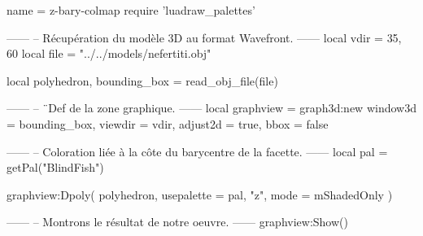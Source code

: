 \documentclass[border = 3pt]{standalone}
\begin{document}
\begin{luadraw*}{name = z-bary-colmap}
require 'luadraw_palettes'

------
-- Récupération du modèle 3D au format Wavefront.
------
local vdir = {35, 60}
local file = "../../models/nefertiti.obj"

local polyhedron, bounding_box = read_obj_file(file)

------
-- ¨Def de la zone graphique.
------
local graphview = graph3d:new{
  window3d = bounding_box,
  viewdir  = vdir,
  adjust2d = true,
  bbox     = false
}

------
-- Coloration liée à la côte du barycentre de la facette.
------
local pal = getPal("BlindFish")

graphview:Dpoly(
  polyhedron,
  {
    usepalette = {pal, "z"},
    mode       = mShadedOnly
  }
)

------
-- Montrons le résultat de notre oeuvre.
------
graphview:Show()
\end{luadraw*}
\end{document}
